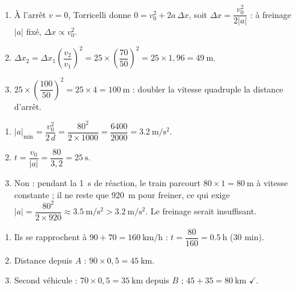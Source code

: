 \documentclass[11pt,a4paper]{article}
\begin{document}

\begin{corrige}
\begin{enumerate}[label=\alph*)]
  \item À l'arrêt $v=0$, Torricelli donne $0=v_0^2+2a\,\Delta x$, soit $\Delta x=\dfrac{v_0^2}{2|a|}$ : à freinage $|a|$ fixé, $\Delta x\propto v_0^2$.
  \item $\Delta x_2=\Delta x_1\left(\dfrac{v_2}{v_1}\right)^2=25\times\left(\dfrac{70}{50}\right)^2=25\times1{,}96=\qty{49}{\metre}$.
  \item $25\times\left(\dfrac{100}{50}\right)^2=25\times4=\qty{100}{\metre}$ : doubler la vitesse quadruple la distance d'arrêt.
\end{enumerate}
\end{corrige}

\begin{corrige}
\begin{enumerate}[label=\alph*)]
  \item $|a|_{\min}=\dfrac{v_0^2}{2\,d}=\dfrac{80^2}{2\times1000}=\dfrac{6400}{2000}=\qty{3,2}{\metre\per\second\squared}$.
  \item $t=\dfrac{v_0}{|a|}=\dfrac{80}{3{,}2}=\qty{25}{\second}$.
  \item Non : pendant la \qty{1}{\second} de réaction, le train parcourt $80\times1=\qty{80}{\metre}$ à vitesse constante ; il ne reste que \qty{920}{\metre} pour freiner, ce qui exige $|a|=\dfrac{80^2}{2\times920}\approx\qty{3,5}{\metre\per\second\squared}>\qty{3,2}{\metre\per\second\squared}$. Le freinage serait insuffisant.
\end{enumerate}
\end{corrige}

\begin{corrige}
\begin{enumerate}[label=\alph*)]
  \item Ils se rapprochent à $90+70=\qty{160}{\kilo\metre\per\hour}$ : $t=\dfrac{80}{160}=\qty{0,5}{\hour}$ (30 min).
  \item Distance depuis $A$ : $90\times0{,}5=\qty{45}{\kilo\metre}$.
  \item Second véhicule : $70\times0{,}5=\qty{35}{\kilo\metre}$ depuis $B$ ; $45+35=\qty{80}{\kilo\metre}$ $\checkmark$.
\end{enumerate}
\end{corrige}
\end{document}

